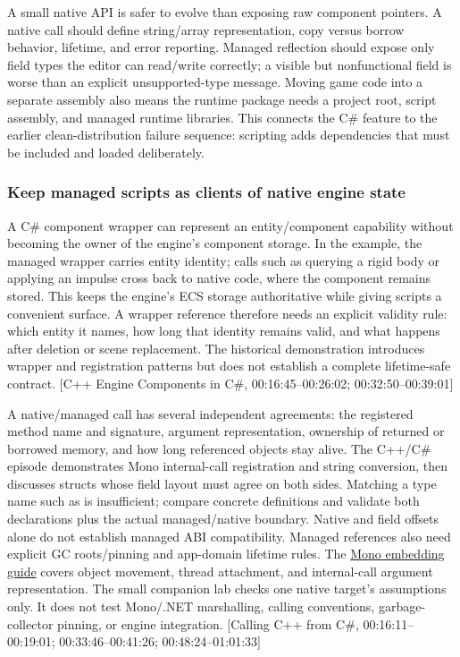 A small native API is safer to evolve than exposing raw component pointers. A native call should define string/array representation, copy versus borrow behavior, lifetime, and error reporting. Managed reflection should expose only field types the editor can read/write correctly; a visible but nonfunctional field is worse than an explicit unsupported-type message. Moving game code into a separate assembly also means the runtime package needs a project root, script assembly, and managed runtime libraries. This connects the C\# feature to the earlier clean-distribution failure sequence: scripting adds dependencies that must be included and loaded deliberately.

\subsubsection{Keep managed scripts as clients of native engine state}\label{06-engine-ii-ch040-keep-managed-scripts-as-clients-of-native-engine-state}

\hypertarget{06-engine-ii-ch040-keep-managed-scripts-as-clients-of-native-engine-state}{}

A C\# component wrapper can represent an entity/component capability without becoming the owner of the engine's component storage. In the example, the managed wrapper carries entity identity; calls such as querying a rigid body or applying an impulse cross back to native code, where the component remains stored. This keeps the engine's ECS storage authoritative while giving scripts a convenient surface. A wrapper reference therefore needs an explicit validity rule: which entity it names, how long that identity remains valid, and what happens after deletion or scene replacement. The historical demonstration introduces wrapper and registration patterns but does not establish a complete lifetime-safe contract. {[}C++ Engine Components in C\#, 00:16:45--00:26:02; 00:32:50--00:39:01{]}

A native/managed call has several independent agreements: the registered method name and signature, argument representation, ownership of returned or borrowed memory, and how long referenced objects stay alive. The C++/C\# episode demonstrates Mono internal-call registration and string conversion, then discusses structs whose field layout must agree on both sides. Matching a type name such as  is insufficient; compare concrete definitions and validate both declarations plus the actual managed/native boundary. Native  and field offsets alone do not establish managed ABI compatibility. Managed references also need explicit GC roots/pinning and app-domain lifetime rules. The \href{https://www.mono-project.com/docs/advanced/embedding/}{Mono embedding guide} covers object movement, thread attachment, and internal-call argument representation. The small companion lab checks one native target's assumptions only. It does not test Mono/.NET marshalling, calling conventions, garbage-collector pinning, or engine integration. {[}Calling C++ from C\#, 00:16:11--00:19:01; 00:33:46--00:41:26; 00:48:24--01:01:33{]}

